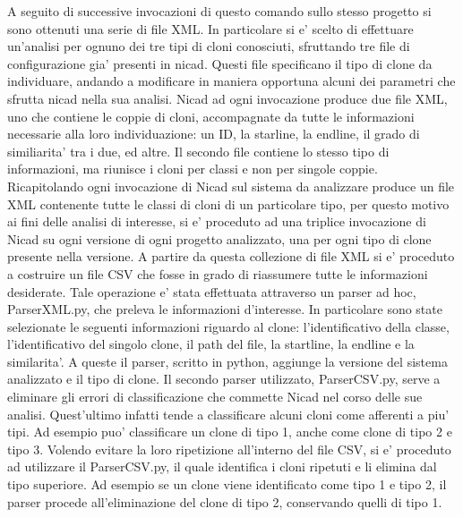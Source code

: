 A seguito di successive invocazioni di questo comando sullo stesso progetto si sono ottenuti una serie di file XML. In particolare si e' scelto di effettuare un'analisi per ognuno dei tre tipi di cloni conosciuti, sfruttando tre file di configurazione gia' presenti in nicad. Questi file specificano il tipo di clone da individuare, andando a modificare in maniera opportuna alcuni dei parametri che sfrutta nicad nella sua analisi. Nicad ad ogni invocazione produce due file XML, uno che contiene le coppie di cloni, accompagnate da tutte le informazioni necessarie alla loro individuazione: un ID, la starline, la endline, il grado di similiarita' tra i due, ed altre. Il secondo file contiene lo stesso tipo di informazioni, ma riunisce i cloni per classi e non per singole coppie.
\\
Ricapitolando ogni invocazione di Nicad sul sistema da analizzare produce un file XML contenente tutte le classi di cloni di un particolare tipo, per questo motivo ai fini delle analisi di interesse, si e' proceduto ad una triplice invocazione di Nicad su ogni versione di ogni progetto analizzato, una per ogni tipo di clone presente nella versione.
A partire da questa collezione di file XML si e' proceduto a costruire un file CSV che fosse in grado di riassumere tutte le informazioni desiderate. Tale operazione e' stata effettuata attraverso un parser ad hoc, ParserXML.py, che preleva le informazioni d'interesse. In particolare sono state selezionate le seguenti informazioni riguardo al clone: l'identificativo della classe, l'identificativo del singolo clone, il path del file, la startline, la endline e la similarita'. A queste il parser, scritto in python, aggiunge la versione del sistema analizzato e il tipo di clone. 
Il secondo parser utilizzato, ParserCSV.py, serve a eliminare gli errori di classificazione che commette Nicad nel corso delle sue analisi. Quest'ultimo infatti tende a classificare alcuni cloni come afferenti a piu' tipi. Ad esempio puo' classificare un clone di tipo 1, anche come clone di tipo 2 e tipo  3. Volendo evitare la loro ripetizione all'interno del file CSV, si e' proceduto ad utilizzare il ParserCSV.py, il quale identifica i cloni ripetuti e li elimina dal tipo superiore. Ad esempio se un clone viene identificato come tipo 1 e tipo 2, il parser procede all'eliminazione del clone di tipo 2, conservando quelli di tipo 1.